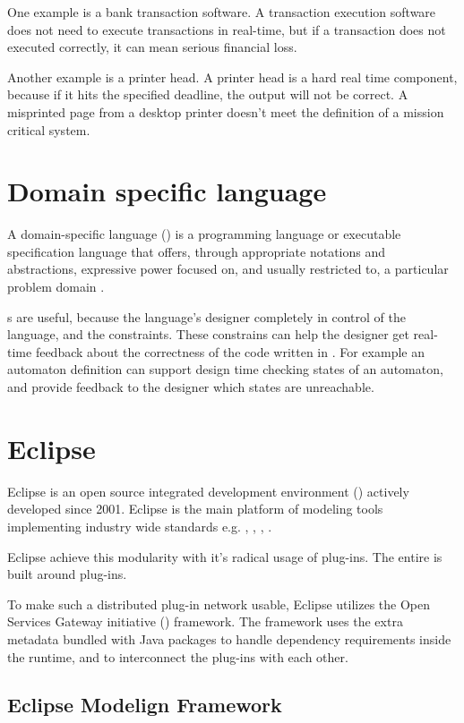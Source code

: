One example is a bank transaction software. A transaction execution software does not need to execute transactions in real-time, but if a transaction does not executed correctly, it can mean serious financial loss.

Another example is a printer head. A printer head is a hard real time component, because if it hits the specified deadline, the output will not be correct. A misprinted page from a desktop printer doesn't meet the definition of a mission critical system.

\section{Domain specific language}

A domain-specific language (\dsl{}) is a programming language or executable specification language that offers, through appropriate notations and abstractions, expressive power focused on, and usually restricted to, a particular problem domain \citep{van2000domain}.

\dsl{}s are useful, because the language's designer completely in control of the language, and the constraints. These constrains can help the designer get real-time feedback about the correctness of the code written in \dsl. For example an automaton definition \dsl{} can support design time checking states of an automaton, and provide feedback to the designer which states are unreachable.

\section{Eclipse}

Eclipse is an open source integrated development environment () actively developed since 2001. Eclipse is the main platform of modeling tools implementing industry wide standards e.g. \emf, , , .

Eclipse achieve this modularity with it's radical usage of plug-ins. The entire  is built around plug-ins.

To make such a distributed plug-in network usable, Eclipse utilizes the Open Services Gateway initiative () framework. The  framework uses the extra metadata bundled with Java packages to handle dependency requirements inside the runtime, and to interconnect the plug-ins with each other.

\subsection{Eclipse Modelign Framework}

